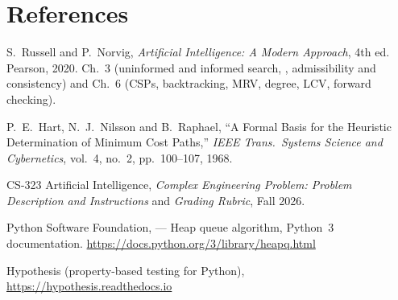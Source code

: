 \newpage
\section{References}
\begin{enumerate}[label={[\arabic*]}]
  \item S.~Russell and P.~Norvig, \emph{Artificial Intelligence: A Modern Approach}, 4th ed.
    Pearson, 2020. Ch.~3 (uninformed and informed search, \astar, admissibility and consistency)
    and Ch.~6 (CSPs, backtracking, MRV, degree, LCV, forward checking).
  \item P.~E.~Hart, N.~J.~Nilsson and B.~Raphael, ``A Formal Basis for the Heuristic Determination
    of Minimum Cost Paths,'' \emph{IEEE Trans.\ Systems Science and Cybernetics}, vol.~4, no.~2,
    pp.~100--107, 1968.
  \item CS-323 Artificial Intelligence, \emph{Complex Engineering Problem: Problem Description and
    Instructions} and \emph{Grading Rubric}, Fall 2026.
  \item Python Software Foundation,  --- Heap queue algorithm, Python~3 documentation.
    \url{https://docs.python.org/3/library/heapq.html}
  \item Hypothesis (property-based testing for Python), \url{https://hypothesis.readthedocs.io}
\end{enumerate}
